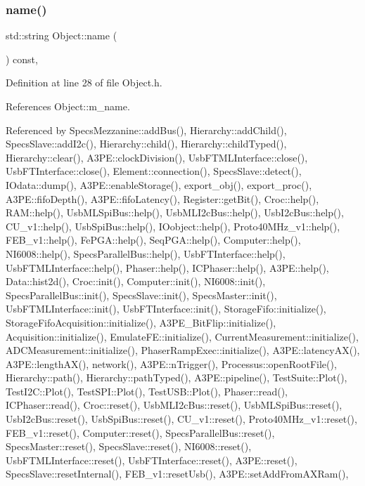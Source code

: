 \subsubsection{\texorpdfstring{name()}{name()}}
{\footnotesize\ttfamily std\+::string Object\+::name (\begin{DoxyParamCaption}{ }\end{DoxyParamCaption}) const\hspace{0.3cm}{\ttfamily [inline]}, {\ttfamily [inherited]}}



Definition at line 28 of file Object.\+h.



References Object\+::m\+\_\+name.



Referenced by Specs\+Mezzanine\+::add\+Bus(), Hierarchy\+::add\+Child(), Specs\+Slave\+::add\+I2c(), Hierarchy\+::child(), Hierarchy\+::child\+Typed(), Hierarchy\+::clear(), A3\+P\+E\+::clock\+Division(), Usb\+F\+T\+M\+L\+Interface\+::close(), Usb\+F\+T\+Interface\+::close(), Element\+::connection(), Specs\+Slave\+::detect(), I\+Odata\+::dump(), A3\+P\+E\+::enable\+Storage(), export\+\_\+obj(), export\+\_\+proc(), A3\+P\+E\+::fifo\+Depth(), A3\+P\+E\+::fifo\+Latency(), Register\+::get\+Bit(), Croc\+::help(), R\+A\+M\+::help(), Usb\+M\+L\+Spi\+Bus\+::help(), Usb\+M\+L\+I2c\+Bus\+::help(), Usb\+I2c\+Bus\+::help(), C\+U\+\_\+v1\+::help(), Usb\+Spi\+Bus\+::help(), I\+Oobject\+::help(), Proto40\+M\+Hz\+\_\+v1\+::help(), F\+E\+B\+\_\+v1\+::help(), Fe\+P\+G\+A\+::help(), Seq\+P\+G\+A\+::help(), Computer\+::help(), N\+I6008\+::help(), Specs\+Parallel\+Bus\+::help(), Usb\+F\+T\+Interface\+::help(), Usb\+F\+T\+M\+L\+Interface\+::help(), Phaser\+::help(), I\+C\+Phaser\+::help(), A3\+P\+E\+::help(), Data\+::hist2d(), Croc\+::init(), Computer\+::init(), N\+I6008\+::init(), Specs\+Parallel\+Bus\+::init(), Specs\+Slave\+::init(), Specs\+Master\+::init(), Usb\+F\+T\+M\+L\+Interface\+::init(), Usb\+F\+T\+Interface\+::init(), Storage\+Fifo\+::initialize(), Storage\+Fifo\+Acquisition\+::initialize(), A3\+P\+E\+\_\+\+Bit\+Flip\+::initialize(), Acquisition\+::initialize(), Emulate\+F\+E\+::initialize(), Current\+Measurement\+::initialize(), A\+D\+C\+Measurement\+::initialize(), Phaser\+Ramp\+Exec\+::initialize(), A3\+P\+E\+::latency\+A\+X(), A3\+P\+E\+::length\+A\+X(), network(), A3\+P\+E\+::n\+Trigger(), Processus\+::open\+Root\+File(), Hierarchy\+::path(), Hierarchy\+::path\+Typed(), A3\+P\+E\+::pipeline(), Test\+Suite\+::\+Plot(), Test\+I2\+C\+::\+Plot(), Test\+S\+P\+I\+::\+Plot(), Test\+U\+S\+B\+::\+Plot(), Phaser\+::read(), I\+C\+Phaser\+::read(), Croc\+::reset(), Usb\+M\+L\+I2c\+Bus\+::reset(), Usb\+M\+L\+Spi\+Bus\+::reset(), Usb\+I2c\+Bus\+::reset(), Usb\+Spi\+Bus\+::reset(), C\+U\+\_\+v1\+::reset(), Proto40\+M\+Hz\+\_\+v1\+::reset(), F\+E\+B\+\_\+v1\+::reset(), Computer\+::reset(), Specs\+Parallel\+Bus\+::reset(), Specs\+Master\+::reset(), Specs\+Slave\+::reset(), N\+I6008\+::reset(), Usb\+F\+T\+M\+L\+Interface\+::reset(), Usb\+F\+T\+Interface\+::reset(), A3\+P\+E\+::reset(), Specs\+Slave\+::reset\+Internal(), F\+E\+B\+\_\+v1\+::reset\+Usb(), A3\+P\+E\+::set\+Add\+From\+A\+X\+Ram(), 